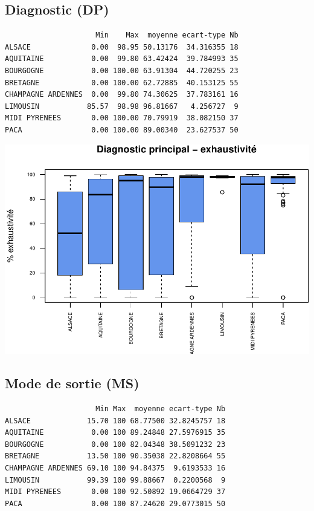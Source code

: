 \documentclass[]{article}
\begin{document}
\subsection{Diagnostic (DP)}\label{diagnostic-dp-2}

\begin{verbatim}
                     Min    Max  moyenne ecart-type Nb
ALSACE              0.00  98.95 50.13176  34.316355 18
AQUITAINE           0.00  99.80 63.42424  39.784993 35
BOURGOGNE           0.00 100.00 63.91304  44.720255 23
BRETAGNE            0.00 100.00 62.72885  40.153125 55
CHAMPAGNE ARDENNES  0.00  99.80 74.30625  37.783161 16
LIMOUSIN           85.57  98.98 96.81667   4.256727  9
MIDI PYRENEES       0.00 100.00 70.79919  38.082150 37
PACA                0.00 100.00 89.00340  23.627537 50
\end{verbatim}

\includegraphics{septembre2015_files/figure-latex/unnamed-chunk-29-1.pdf}

\subsection{Mode de sortie (MS)}\label{mode-de-sortie-ms-2}

\begin{verbatim}
                     Min Max  moyenne ecart-type Nb
ALSACE             15.70 100 68.77500 32.8245757 18
AQUITAINE           0.00 100 89.24848 27.5976915 35
BOURGOGNE           0.00 100 82.04348 38.5091232 23
BRETAGNE           13.50 100 90.35038 22.8208664 55
CHAMPAGNE ARDENNES 69.10 100 94.84375  9.6193533 16
LIMOUSIN           99.39 100 99.88667  0.2200568  9
MIDI PYRENEES       0.00 100 92.50892 19.0664729 37
PACA                0.00 100 87.24620 29.0773015 50
\end{verbatim}
\end{document}
